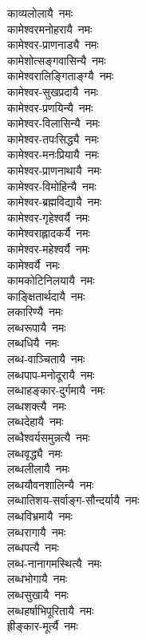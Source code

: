 \begin{multicols}{2}
\begin{flushleft}
काव्यलोलायै~नमः\\
कामेश्वरमनोहरायै~नमः\\
कामेश्वर-प्राणनाड्यै~नमः\\
कामेशोत्सङ्गवासिन्यै~नमः\\
कामेश्वरालिङ्गिताङ्ग्यै~नमः\\
कामेश्वर-सुखप्रदायै~नमः\\
कामेश्वर-प्रणयिन्यै~नमः\\
कामेश्वर-विलासिन्यै~नमः\\
कामेश्वर-तपःसिद्ध्यै~नमः\hfill {}\\
कामेश्वर-मनःप्रियायै~नमः\\
कामेश्वर-प्राणनाथायै~नमः\\
कामेश्वर-विमोहिन्यै~नमः\\
कामेश्वर-ब्रह्मविद्यायै~नमः\\
कामेश्वर-गृहेश्वर्यै~नमः\\
कामेश्वराह्लादकर्यै~नमः\\
कामेश्वर-महेश्वर्यै~नमः\\
कामेश्वर्यै~नमः\\
कामकोटिनिलयायै~नमः\\
काङ्क्षितार्थदायै~नमः\hfill {}\\
लकारिण्यै~नमः\\
लब्धरूपायै~नमः\\
लब्धधियै~नमः\\
लब्ध-वाञ्चितायै~नमः\\
लब्धपाप-मनोदूरायै~नमः\\
लब्धाहङ्कार-दुर्गमायै~नमः\\
लब्धशक्त्यै~नमः\\
लब्धदेहायै~नमः\\
लब्धैश्वर्यसमुन्नत्यै~नमः\\
लब्धवृद्ध्यै~नमः\hfill {}\\
लब्धलीलायै~नमः\\
लब्धयौवनशालिन्यै~नमः\\
लब्धातिशय-सर्वाङ्ग-सौन्दर्यायै~नमः\\
लब्धविभ्रमायै~नमः\\
लब्धरागायै~नमः\\
लब्धपत्यै~नमः\\
लब्ध-नानागमस्थित्यै~नमः\\
लब्धभोगायै~नमः\\
लब्धसुखायै~नमः\\
लब्धहर्षाभिपूरितायै~नमः\hfill {}\\
ह्रीङ्कार-मूर्त्यै~नमः\\

\end{flushleft}
\end{multicols}
